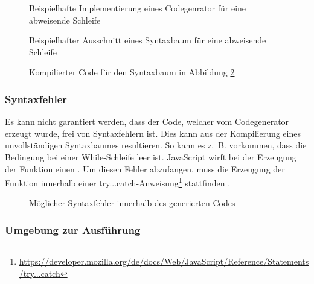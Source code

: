 \begin{figure}
  
  \caption{Beispielhafte Implementierung eines Codegenrator für eine abweisende Schleife}
  \label{fig:implementation:program:evaluation:while}
\end{figure}

\begin{figure}
  
  \caption{Beispielhafter Ausschnitt eines Syntaxbaum für eine abweisende Schleife}
  \label{fig:implementation:program:evaluation:tree}
\end{figure}

\begin{figure}
  
  \caption{Kompilierter Code für den Syntaxbaum in Abbildung \ref{fig:implementation:program:evaluation:tree}}
  \label{fig:implementation:program:evaluation:tree-result}
\end{figure}

\subsubsection{Syntaxfehler}

Es kann nicht garantiert werden, dass der Code, welcher vom Codegenerator erzeugt wurde, frei von Syntaxfehlern ist. Dies kann aus der Kompilierung eines unvollständigen Syntaxbaumes resultieren. So kann es z.~B. vorkommen, dass die Bedingung bei einer While-Schleife leer ist. JavaScript wirft bei der Erzeugung der Funktion einen . Um diesen Fehler abzufangen, muss die Erzeugung der Funktion innerhalb einer try...catch-Anweisung\footnote{\url{https://developer.mozilla.org/de/docs/Web/JavaScript/Reference/Statements/try...catch}} stattfinden .

\begin{figure}
  
  \caption{Möglicher Syntaxfehler innerhalb des generierten Codes}
  \label{fig:implementation:program:evaluation:try-catch}
\end{figure}

\subsubsection{Umgebung zur Ausführung}

